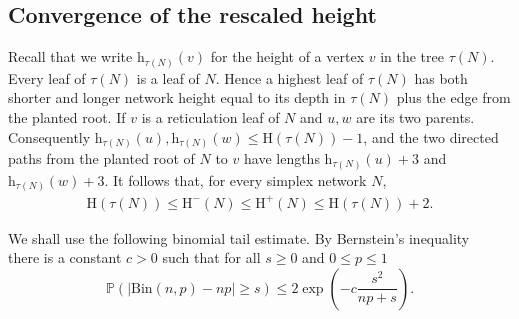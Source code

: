 \documentclass[english,11pt]{smfart}
\newcommand{\Prb}[1]{\mathbb{P}\left(#1\right)}
\newcommand{\He}{\mathrm{H}}
\newcommand{\he}{\mathrm{h}}
\numberwithin{equation}{section}
\begin{document}
\subsection{Convergence of the rescaled height}

\label{sec:scalheight}



Recall that we write $\he_{\tau(N)}(v)$ for the height of a vertex $v$ in the tree $\tau(N)$. Every leaf of $\tau(N)$ is a leaf of $N$. Hence a highest leaf of $\tau(N)$ has both shorter and longer network height equal to its depth in $\tau(N)$ plus the edge from the planted root. If $v$ is a reticulation leaf of $N$ and $u,w$ are its two parents. Consequently $\he_{\tau(N)}(u), \he_{\tau(N)}(w) \le \He(\tau(N))- 1$, and the two directed paths from the planted root of $N$ to $v$ have lengths $\he_{\tau(N)}(u)+3$ and $\he_{\tau(N)}(w) + 3$. It follows that, for every simplex network $N$,
\begin{align}
	\label{eq:heightcompare}
	\He(\tau(N)) \le \He^-(N) \le \He^+(N) \le \He(\tau(N)) + 2.
\end{align}


We shall use the following binomial tail estimate. By Bernstein's inequality~\cite[Eq. (2.10)]{zbMATH06586491} there is a constant $c>0$ such that for all $s \ge 0$ and $0 \le p \le 1$
\begin{equation}
	\label{eq:bbound}
	\Prb{|\mathrm{Bin}(n,p) - n p|\ge s} \le 2 \exp\left(-c \frac{s^2}{np + s}\right).
\end{equation}
\end{document}
